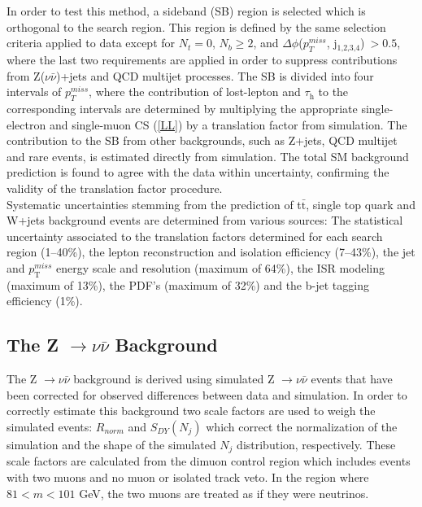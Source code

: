 In order to test this method, a sideband (SB) region is selected which is orthogonal to the search region. This region is defined by the same selection criteria applied to data except for $N_t = 0$, $N_b \geq 2$, and $\Delta\phi$($p_{T}^{miss}$,  j$_\text{1,2,3,4}$)$~> 0.5$, where the last two requirements are applied in order to suppress contributions from Z($\nu\bar{\nu}$)+jets and QCD multijet processes. The SB is divided into four intervals of $p_{T}^{miss}$, where the contribution of lost-lepton and $\tau_\text{h}$ to the corresponding intervals are determined by multiplying the appropriate single-electron and single-muon CS (\autoref{LL}) by a translation factor from simulation. The contribution to the SB from other backgrounds, such as Z+jets, QCD multijet and rare events, is estimated directly from simulation. The total SM background prediction is found to agree with the data within uncertainty, confirming the validity of the translation factor procedure.\\

Systematic uncertainties stemming from the prediction of t$\bar{\text{t}}$, single top quark and W+jets background events are determined from various sources: The statistical uncertainty associated to the translation factors determined for each search region (1--40\%), the lepton reconstruction and isolation efficiency (7--43\%), the jet and $p_{\text{T}}^{miss}$ energy scale and resolution (maximum of 64\%), the ISR modeling (maximum of 13\%), the PDF's (maximum of 32\%) and the b-jet tagging efficiency (1\%).

\subsection{The Z $\rightarrow\nu\bar{\nu}$ Background}\label{ZnunuSection}

The Z $\rightarrow\nu\bar{\nu}$ background is derived using simulated Z $\rightarrow\nu\bar{\nu}$ events that have been corrected for observed differences between data and simulation. In order to correctly estimate this background two scale factors are used to weigh the simulated events: $R_{norm}$ and $S_{DY}( N_j)$  which correct the normalization of the simulation and the shape of the simulated $N_j$ distribution, respectively. These scale factors are calculated from the dimuon control region which includes events with two muons and no muon or isolated track veto. In the region where $81 < m < 101$ GeV, the two muons are treated as if they were neutrinos.\\

